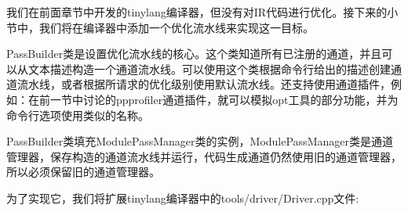 
我们在前面章节中开发的tinylang编译器，但没有对IR代码进行优化。接下来的小节中，我们将在编译器中添加一个优化流水线来实现这一目标。


PassBuilder类是设置优化流水线的核心。这个类知道所有已注册的通道，并且可以从文本描述构造一个通道流水线。可以使用这个类根据命令行给出的描述创建通道流水线，或者根据所请求的优化级别使用默认流水线。还支持使用通道插件，例如：在前一节中讨论的ppprofiler通道插件，就可以模拟opt工具的部分功能，并为命令行选项使用类似的名称。

PassBuilder类填充ModulePassManager类的实例，ModulePassManager类是通道管理器，保存构造的通道流水线并运行，代码生成通道仍然使用旧的通道管理器，所以必须保留旧的通道管理器。

为了实现它，我们将扩展tinylang编译器中的tools/driver/Driver.cpp文件:

